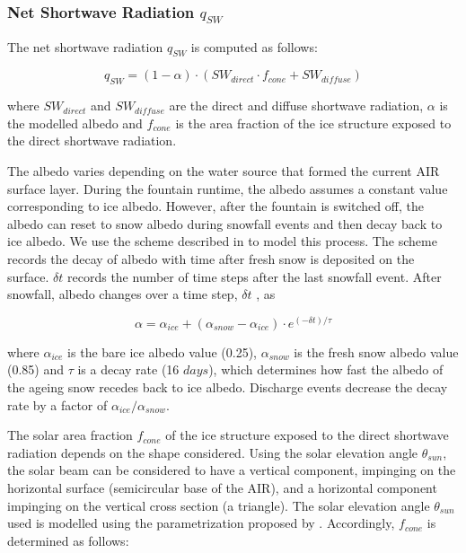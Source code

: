 \subsubsection{Net Shortwave Radiation \texorpdfstring{$q_{SW}$}{Lg}} \label{sec:SW}

The net shortwave radiation $q_{SW}$ is computed as follows:

\begin{equation} q_{SW} = (1- \alpha)\cdot (SW_{direct} \cdot f_{cone} + SW_{diffuse}) \label{eqn:SW} \end{equation}

where $SW_{direct}$ and $SW_{diffuse}$ are the direct and diffuse shortwave radiation, $\alpha$ is the
modelled albedo and $f_{cone}$ is the area fraction of the ice structure exposed to the direct shortwave
radiation.

The albedo varies depending on the water source that formed the current AIR surface layer. During the fountain
runtime, the albedo assumes a constant value corresponding to ice albedo. However, after the fountain is
switched off, the albedo can reset to snow albedo during snowfall events and then decay back to ice albedo. We
use the scheme described in \cite{oerlemansYearRecordGlobal1998} to model this process. The scheme records the
decay of albedo with time after fresh snow is deposited on the surface. $\delta t$ records the number of time
steps after the last snowfall event. After snowfall, albedo changes over a time step, $\delta t$ , as

\begin{equation} \alpha=\alpha_{ice}+(\alpha_{snow}-\alpha_{ice}) \cdot e^{(-\delta t)/\tau} \label{eqn:alb}
\end{equation}

where $\alpha_{ice}$ is the bare ice albedo value (0.25), $\alpha_{snow}$ is the fresh snow albedo value (0.85)
and $\tau$ is a decay rate (16 $days$), which determines how fast the albedo of the ageing snow recedes back to
ice albedo. Discharge events decrease the decay rate by a factor of $\alpha_{ice}/\alpha_{snow}$.

The solar area fraction $f_{cone}$ of the ice structure exposed to the direct shortwave radiation depends on the shape
considered. Using the solar elevation angle $\theta_{sun}$, the solar beam can be considered to have a vertical
component, impinging on the horizontal surface (semicircular base of the AIR), and a horizontal component
impinging on the vertical cross section (a triangle). The solar elevation angle $\theta_{sun}$ used is modelled
using the parametrization proposed by \cite{woolfComputationSolarElevation1968}. Accordingly, $f_{cone}$ is determined as follows:

